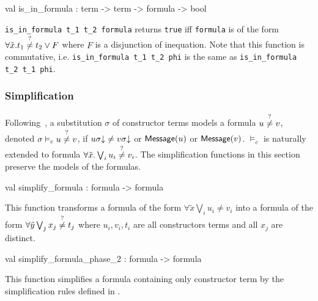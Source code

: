 \label{val:Term.is-underscorein-underscoreformula}\begin{ocamldoccode}
val is_in_formula : term -> term -> formula -> bool
\end{ocamldoccode}
\begin{ocamldocdescription}
{\tt{is\_in\_formula t\_1 t\_2 formula}} returns {\tt{true}} iff {\tt{formula}} is of the form $\forall \tilde{x}. t_1 \stackrel{?}{\neq} t_2 \vee F$
    where $F$ is a disjunction of inequation. 
    Note that this function is commutative, i.e. {\tt{is\_in\_formula t\_1 t\_2 phi}} is the same as {\tt{is\_in\_formula t\_2 t\_1 phi}}.


\end{ocamldocdescription}




\subsubsection{Simplification}




Following~\thesis, a substitution $\sigma$ of constructor terms models a formula $u \stackrel{?}{\neq} v$, denoted $\sigma \vDash_c u \stackrel{?}{\neq} v$, if
    $u\sigma\mathord\downarrow \neq v\sigma\mathord\downarrow$ or $\mathsf{Message}(u)$ or $\mathsf{Message}(v)$.
    $\vDash_c$ is naturally extended to formula $\forall \tilde{x}. \bigvee_i u_i \stackrel{?}{\neq} v_i$.
    The simplification functions in this section preserve the models of the formulas.



\label{val:Term.simplify-underscoreformula}\begin{ocamldoccode}
val simplify_formula : formula -> formula
\end{ocamldoccode}
\begin{ocamldocdescription}
This function transforms a formula of the form $\forall \tilde{x} \bigvee_i u_i \neq v_i$ into 
    a formula of the form $\forall \tilde{y} \bigvee_j x_j \stackrel{?}{\neq} t_j$ where $u_i,v_i,t_i$ are all constructors terms
    and all $x_j$ are distinct.


\end{ocamldocdescription}




\label{val:Term.simplify-underscoreformula-underscorephase-underscore2}\begin{ocamldoccode}
val simplify_formula_phase_2 : formula -> formula
\end{ocamldoccode}
\begin{ocamldocdescription}
This function simplifies a formula containing only constructor term by the simplification rules 
     defined in . 


\end{ocamldocdescription}




